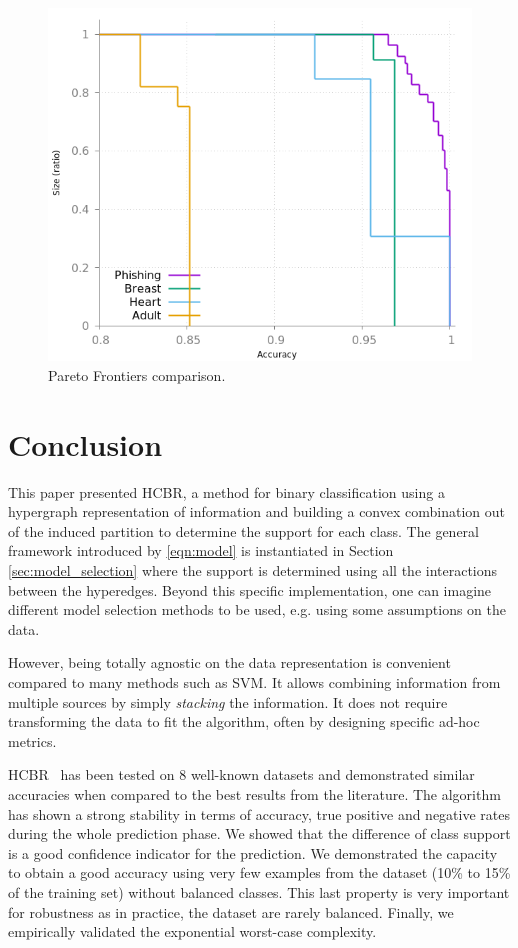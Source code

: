 \documentclass[sigconf,edbt]{acmart-edbt-workshops}
\def\HCBR{{\sc HCBR}}
\begin{document}
\begin{figure}[!h]\centering
\includegraphics[scale=0.35]{img/meta_pareto_all_front.png}
\caption{Pareto Frontiers comparison.}
\label{fig:meta_all}
\end{figure}

\section{Conclusion}
\label{sec:conclusion}

This paper presented \HCBR, a method for binary classification using a hypergraph representation of information and building a convex combination out of the induced partition to determine the support for each class. The general framework introduced by \eqref{eqn:model} is instantiated in Section \ref{sec:model_selection} where the support is determined using all the interactions between the hyperedges. Beyond this specific implementation, one can imagine different model selection methods to be used, e.g. using some assumptions on the data.

However, being totally agnostic on the data representation is convenient compared to many methods such as SVM. It allows combining information from multiple sources by simply {\it stacking} the information. It does not require transforming the data to fit the algorithm, often by designing specific ad-hoc metrics.

\HCBR~ has been tested on 8 well-known datasets and demonstrated similar accuracies when compared to the best results from the literature. The algorithm has shown a strong stability in terms of accuracy, true positive and negative rates during the whole prediction phase. We showed that the difference of class support is a good confidence indicator for the prediction. We demonstrated the capacity to obtain a good accuracy using very few examples from the dataset (10\% to 15\% of the training set) without balanced classes. This last property is very important for robustness as in practice, the dataset are rarely balanced. Finally, we empirically validated the exponential worst-case complexity.
\end{document}
